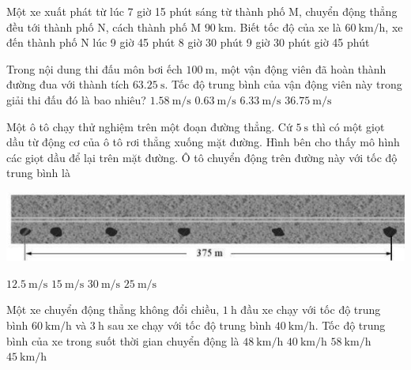 \begin{ex}
	Một xe xuất phát từ lúc 7 giờ 15 phút sáng từ thành phố M, chuyển động thẳng đều tới thành phố N, cách thành phố M $\SI{90}{\kilo\meter}$. Biết tốc độ của xe là $\SI{60}{\kilo\meter/\hour}$, xe đến thành phố N lúc
	\choice
	{9 giờ 45 phút}
	{8 giờ 30 phút}
	{9 giờ 30 phút}
	{ giờ 45 phút}
\end{ex}
\begin{ex}
	Trong nội dung thi đấu môn bơi ếch $\SI{100}{\meter}$, một vận động viên đã hoàn thành đường đua với thành tích $\SI{63.25}{\second}$. Tốc độ trung bình của vận động viên này trong giải thi đấu đó là bao nhiêu?
	\choice
	{\True $\SI{1.58}{\meter/\second}$}
	{$\SI{0.63}{\meter/\second}$}
	{$\SI{6.33}{\meter/\second}$}
	{$\SI{36.75}{\meter/\second}$}
\end{ex}
\begin{ex}
Một ô tô chạy thử nghiệm trên một đoạn đường thẳng. Cứ $\SI{5}{\second}$ thì có một giọt dầu từ động cơ của ô tô rơi thẳng xuống mặt đường. Hình bên cho thấy mô hình các giọt dầu để lại trên mặt đường. Ô tô chuyển động trên đường này với tốc độ trung bình là
\begin{center}
	\includegraphics[width=0.5\linewidth]{figs/VN10-2022-PH-TP004-1-P-1}
\end{center}	
	\choice
	{$\SI{12.5}{\meter/\second}$}
	{\True $\SI{15}{\meter/\second}$}
	{$\SI{30}{\meter/\second}$}
	{$\SI{25}{\meter/\second}$}
\end{ex}
\begin{ex}
	Một xe chuyển động thẳng không đổi chiều, $\SI{1}{\hour}$ đầu xe chạy với tốc độ trung bình $\SI{60}{\kilo\meter/\hour}$ và $\SI{3}{\hour}$ sau xe chạy với tốc độ trung bình $\SI{40}{\kilo\meter/\hour}$. Tốc độ trung bình của xe trong suốt thời gian chuyển động là
	\choice
	{$\SI{48}{\kilo\meter/\hour}$}
	{$\SI{40}{\kilo\meter/\hour}$}
	{$\SI{58}{\kilo\meter/\hour}$}
	{\True $\SI{45}{\kilo\meter/\hour}$}
\end{ex}
